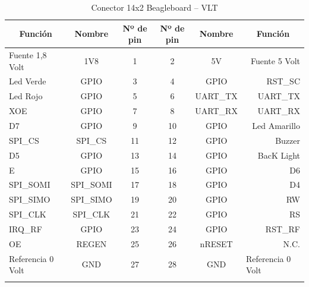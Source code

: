 \begin{longtable}{|l|c|c|c|c|r|}
\hline
\multicolumn{1}{|c|}{\textbf{Función}} & \textbf{Nombre} & \textbf{Nº de pin} & \textbf{Nº de pin} & \textbf{Nombre} & \multicolumn{1}{c|}{\textbf{Función}} \\ \hline
Fuente 1,8 Volt & 1V8 & 1 & 2 & 5V & Fuente 5 Volt \\ \hline
Led Verde & GPIO & 3 & 4 & GPIO & RST\_SC \\ \hline
Led Rojo & GPIO & 5 & 6 & UART\_TX & UART\_TX \\ \hline
XOE & GPIO & 7 & 8 & UART\_RX & UART\_RX \\ \hline
D7 & GPIO & 9 & 10 & GPIO & Led Amarillo \\ \hline
SPI\_CS & SPI\_CS & 11 & 12 & GPIO & Buzzer \\ \hline
D5 & GPIO & 13 & 14 & GPIO & BacK Light \\ \hline
E & GPIO & 15 & 16 & GPIO & D6 \\ \hline
SPI\_SOMI & SPI\_SOMI & 17 & 18 & GPIO & D4 \\ \hline
SPI\_SIMO & SPI\_SIMO & 19 & 20 & GPIO & RW \\ \hline
SPI\_CLK & SPI\_CLK & 21 & 22 & GPIO & RS \\ \hline
IRQ\_RF & GPIO & 23 & 24 & GPIO & RST\_RF \\ \hline
OE & REGEN & 25 & 26 & nRESET & N.C. \\ \hline
Referencia 0 Volt & GND & 27 & 28 & GND & \multicolumn{1}{l|}{Referencia 0 Volt} \\ \hline
\caption{Conector 14x2 Beagleboard – VLT}\label{c_VLT}
\end{longtable}


